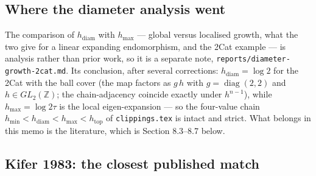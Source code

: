 \documentclass[
]{article}
\begin{document}
\subsection{Where the diameter analysis
went}\label{where-the-diameter-analysis-went}

The comparison of \(h_{\mathrm{diam}}\) with \(h_{\max}\) --- global
versus localised growth, what the two give for a linear expanding
endomorphism, and the 2Cat example --- is analysis rather than prior
work, so it is a separate note,
\texttt{reports/diameter-growth-2cat.md}. Its conclusion, after several
corrections: \(h_{\mathrm{diam}}=\log2\) for the 2Cat with the ball
cover (the map factors as \(g\,h\) with \(g=\operatorname{diag}(2,2)\)
and \(h\in GL_2(\mathbb Z)\); the chain-adjacency coincide exactly under
\(h^{n-1}\)), while \(h_{\max}=\log2\tau\) is the local eigen-expansion
--- so the four-value chain
\(h_{\min}<h_{\mathrm{diam}}<h_{\max}<h_{\mathrm{top}}\) of
\texttt{clippings.tex} is intact and strict. What belongs in this memo
is the literature, which is Section 8.3--8.7 below.

\subsection{Kifer 1983: the closest published
match}\label{kifer-1983-the-closest-published-match}
\end{document}
